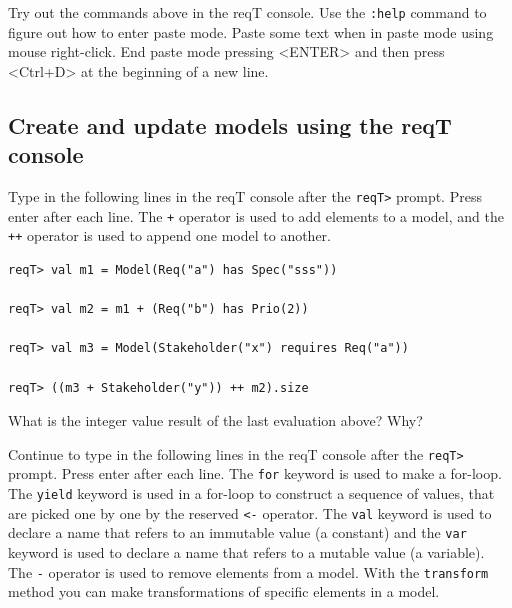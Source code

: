 \documentclass[11pt]{article}
\begin{document}
{\begin{framed}\noindent
Try out the commands above in the reqT console. Use the \verb+:help+ command to figure out how to enter paste mode. Paste some text when in paste mode using mouse right-click. End paste mode pressing <ENTER> and then press <Ctrl+D> at the beginning of a new line. %
\end{framed}}

\subsection{Create and update models using the reqT console}

\begin{framed}\noindent
Type in the following lines in the reqT console after the \verb+reqT>+ prompt. Press enter after each line. The \verb?+? operator is used to add elements to a model, and the  \verb?++? operator is used to append one model to another.

{\small\begin{verbatim}
reqT> val m1 = Model(Req("a") has Spec("sss"))

reqT> val m2 = m1 + (Req("b") has Prio(2))

reqT> val m3 = Model(Stakeholder("x") requires Req("a"))

reqT> ((m3 + Stakeholder("y")) ++ m2).size
\end{verbatim}}


\noindent What is the integer value result of the last evaluation above? Why?
\newline 
\newline
\newline \underline{\hspace{10cm}}

\vspace{7mm}
\noindent Continue to type in the following lines in the reqT console after the \verb+reqT>+ prompt. Press enter after each line. The \verb+for+ keyword is used to make a for-loop. The \verb+yield+ keyword is used in a for-loop to construct a sequence of values, that are picked one by one by the reserved  \verb+<-+ operator.  The \verb+val+ keyword is used to declare a name that refers to an immutable value (a constant) and the \verb+var+ keyword is used to declare a name that refers to a mutable value (a variable). The \verb?-? operator is used to remove elements from a model. With the \verb+transform+ method you can make transformations of specific elements in a model. 



\end{framed}
\end{document}
